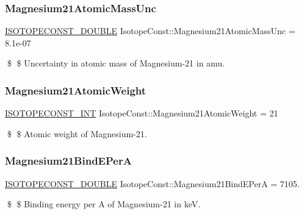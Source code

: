 \subsubsection{\texorpdfstring{Magnesium21\+Atomic\+Mass\+Unc}{Magnesium21AtomicMassUnc}}
{\footnotesize\ttfamily \mbox{\hyperlink{group___isotope_const-_macros_ga8f45a7272ce02c0b4c65c44636ed719a}{I\+S\+O\+T\+O\+P\+E\+C\+O\+N\+S\+T\+\_\+\+D\+O\+U\+B\+LE}} Isotope\+Const\+::\+Magnesium21\+Atomic\+Mass\+Unc = 8.\+1e-\/07}

\$ \$ Uncertainty in atomic mass of Magnesium-\/21 in amu. \mbox{\label{group___isotope_const-_magnesium-_mg21_ga0c5bedda9f75dab80680adb2667b46f0}} 
\subsubsection{\texorpdfstring{Magnesium21\+Atomic\+Weight}{Magnesium21AtomicWeight}}
{\footnotesize\ttfamily \mbox{\hyperlink{group___isotope_const-_macros_ga5f18360b3e99483a35c32d789e62621c}{I\+S\+O\+T\+O\+P\+E\+C\+O\+N\+S\+T\+\_\+\+I\+NT}} Isotope\+Const\+::\+Magnesium21\+Atomic\+Weight = 21}

\$ \$ Atomic weight of Magnesium-\/21. \mbox{\label{group___isotope_const-_magnesium-_mg21_gafe3089372416f99cdf89669eb18e3466}} 
\subsubsection{\texorpdfstring{Magnesium21\+Bind\+E\+PerA}{Magnesium21BindEPerA}}
{\footnotesize\ttfamily \mbox{\hyperlink{group___isotope_const-_macros_ga8f45a7272ce02c0b4c65c44636ed719a}{I\+S\+O\+T\+O\+P\+E\+C\+O\+N\+S\+T\+\_\+\+D\+O\+U\+B\+LE}} Isotope\+Const\+::\+Magnesium21\+Bind\+E\+PerA = 7105.}

\$ \$ Binding energy per A of Magnesium-\/21 in keV. \mbox{\label{group___isotope_const-_magnesium-_mg21_gac5e64aeed53c435a019e24873d026f02}} 
